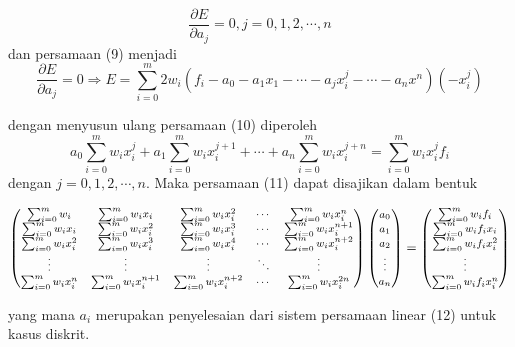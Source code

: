 \documentclass[a4paper,12pt]{article}
\begin{document}
\begin{enumerate}
$$ \frac{\partial E}{\partial a_j} = 0, j=0,1,2,\cdots,n $$
dan persamaan (9) menjadi 
\begin{equation}
	\frac{\partial E}{\partial a_j} = 0 \Rightarrow E= \sum_{i=0}^m 2w_i(f_i-a_0-a_1 x_1-\cdots-a_j x_i^j-\cdots-a_n x^n)(-x_i^j)
\end{equation}

dengan menyusun ulang persamaan (10) diperoleh
\begin{equation}
	a_0\sum_{i=0}^m w_ix_i^j + a_1\sum_{i=0}^m w_ix_i^{j+1} + \cdots + a_n\sum_{i=0}^m w_ix_i^{j+n}= \sum_{i=0}^m w_ix_i^jf_i
\end{equation}
dengan $j=0,1,2,\cdots,n$. Maka persamaan (11) dapat disajikan dalam bentuk
\begin{footnotesize}
	\begin{equation}
		{\fontsize{8}{11}\selectfont
		\begin{pmatrix}
			\sum_{i=0}^m w_i & \sum_{i=0}^m w_ix_i & \sum_{i=0}^m w_ix_i^2 & \cdots & \sum_{i=0}^m w_ix_i^n\\
			\sum_{i=0}^m w_ix_i & \sum_{i=0}^m w_ix_i^2 & \sum_{i=0}^m w_ix_i^3 & \cdots & \sum_{i=0}^m w_ix_i^{n+1}\\
			\sum_{i=0}^m w_ix_i^2 & \sum_{i=0}^m w_ix_i^3 & \sum_{i=0}^m w_ix_i^4 & \cdots & \sum_{i=0}^m w_ix_i^{n+2}\\
			\vdots & \vdots &  \vdots & \ddots & \vdots\\ 
			\sum_{i=0}^m w_ix_i^{n} & \sum_{i=0}^m w_ix_i^{n+1} & \sum_{i=0}^m w_ix_i^{n+2} & \cdots & \sum_{i=0}^m w_ix_i^{2n}
		\end{pmatrix}
		\begin{pmatrix}
			a_{0}\\
			a_{1}\\ 
			a_{2}\\
			\vdots\\ 
			a_{n}  
		\end{pmatrix}
		=
		\begin{pmatrix}
			\sum_{i=0}^m w_if_i\\
			\sum_{i=0}^m w_if_ix_i\\ 
			\sum_{i=0}^m w_if_ix_i^2\\
			\vdots\\ 
			\sum_{i=0}^m w_i f_ix_i^n
		\end{pmatrix}
		}
	\end{equation}
\end{footnotesize}

yang mana $a_i$ merupakan penyelesaian dari sistem persamaan linear (12) untuk kasus diskrit.
\end{enumerate}
\end{document}
